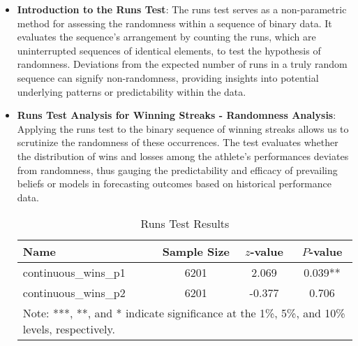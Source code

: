 \documentclass{mcmthesis}
\begin{document}
\begin{itemize}
\item {\bf Introduction to the Runs Test}: The runs test serves as a non-parametric method for assessing the randomness within a sequence of binary data. It evaluates the sequence's arrangement by counting the runs, which are uninterrupted sequences of identical elements, to test the hypothesis of randomness. Deviations from the expected number of runs in a truly random sequence can signify non-randomness, providing insights into potential underlying patterns or predictability within the data.

\item {\bf Runs Test Analysis for Winning Streaks - Randomness Analysis}: Applying the runs test to the binary sequence of winning streaks allows us to scrutinize the randomness of these occurrences. The test evaluates whether the distribution of wins and losses among the athlete's performances deviates from randomness, thus gauging the predictability and efficacy of prevailing beliefs or models in forecasting outcomes based on historical performance data.
\begin{table}[ht]
    \centering
    \caption{Runs Test Results}
    \label{tab:runs_test_results}
    \begin{tabular}{lccc}
        \hline
        Name                 & Sample Size & \(z\)-value & \(P\)-value                                                               \\ \hline
        continuous\_wins\_p1 & 6201        & 2.069       & 0.039**                                                                   \\
        continuous\_wins\_p2 & 6201        & -0.377      & 0.706                                                                     \\ \hline
        \multicolumn{4}{l}{\footnotesize Note: ***, **, and * indicate significance at the 1\%, 5\%, and 10\% levels, respectively.} \\
    \end{tabular}
\end{table}


\end{itemize}
\end{document}
